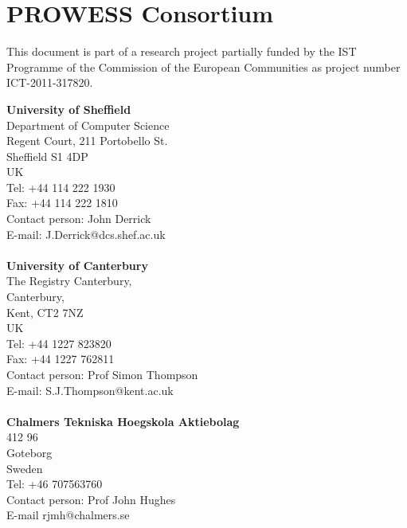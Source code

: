 \section*{PROWESS Consortium}

This document is part of a research project partially funded by the IST Programme of the Commission of the European Communities as project number ICT-2011-317820.\\[0.2cm]

\begin{footnotesize}
\begin{minipage}[t]{0.5\linewidth}
	\textbf{University of Sheffield}\\
	Department of Computer Science\\
	Regent Court, 211 Portobello St.\\
	Sheffield S1 4DP\\
	UK\\
	Tel: +44 114 222 1930\\
	Fax: +44 114 222 1810\\
	Contact person: John Derrick\\
	E-mail: J.Derrick@dcs.shef.ac.uk\\
	\\
	
	\textbf{University of Canterbury}\\
	The Registry Canterbury,\\
	Canterbury,\\
	Kent, CT2 7NZ\\
	UK \\
	Tel: +44 1227 823820\\
	Fax: +44 1227 762811\\
	Contact person: Prof Simon Thompson\\
	E-mail: S.J.Thompson@kent.ac.uk\\
	\\
	
	\textbf{Chalmers Tekniska Hoegskola Aktiebolag}\\
	412 96\\
	Goteborg\\
	Sweden \\
	Tel: +46 707563760\\
	Contact person: Prof John Hughes\\
	E-mail rjmh@chalmers.se\\
	\\
	

\end{minipage}
\end{footnotesize}
